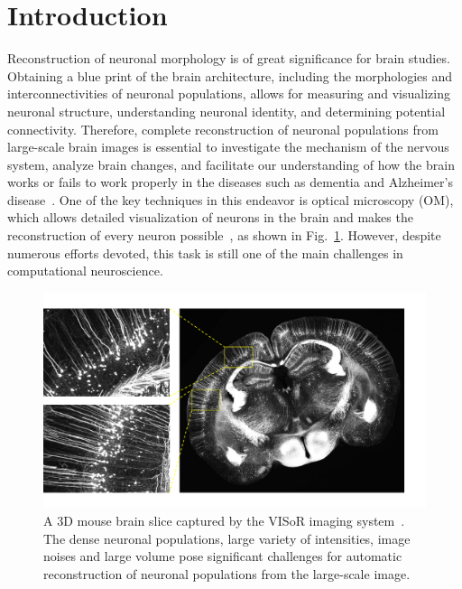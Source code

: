 \section{Introduction}
\label{sec:introduction}

Reconstruction of neuronal morphology is of great significance for brain studies. Obtaining a blue print of the brain architecture, including the morphologies and interconnectivities of neuronal populations, allows for measuring and visualizing neuronal structure, understanding neuronal identity, and determining potential connectivity.
Therefore, complete reconstruction of neuronal populations from large-scale brain images is essential to investigate the mechanism of the nervous system, analyze brain changes, and facilitate our understanding of how the brain works or fails to work properly in the diseases such as dementia and Alzheimer's disease~\cite{Petrella2003, Giorgio2013}.
One of the key techniques in this endeavor is optical microscopy (OM), which allows detailed visualization of neurons in the brain and makes the reconstruction of every neuron possible~\cite{Senft2011}, as shown in Fig.~\ref{fig:brain}.
However, despite numerous efforts devoted, this task is still one of the main challenges in computational neuroscience.

\begin{figure}[t]
	\centering
	\includegraphics[width=1\columnwidth]{./Illustrations/brain2.pdf}
	\caption{A 3D mouse brain slice captured by the VISoR imaging system~\cite{Wang2019}. The dense neuronal populations, large variety of intensities, image noises and large volume pose significant challenges for automatic reconstruction of neuronal populations from the large-scale image.}	
	\label{fig:brain}
\end{figure}

